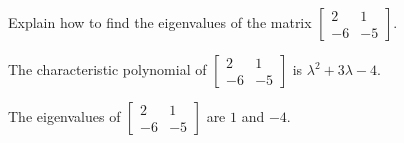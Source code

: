 
\begin{exerciseStatement}


Explain how to find the eigenvalues of the matrix \( \left[\begin{array}{cc}
2 & 1 \\
-6 & -5
\end{array}\right] \).


\end{exerciseStatement}
    
\begin{exerciseAnswer} 


The characteristic polynomial of \( \left[\begin{array}{cc}
2 & 1 \\
-6 & -5
\end{array}\right] \) is \( \lambda^{2} + 3 \lambda - 4 \).



The eigenvalues of \( \left[\begin{array}{cc}
2 & 1 \\
-6 & -5
\end{array}\right] \) are \( 1 \) and \( -4 \).


\end{exerciseAnswer}
    
